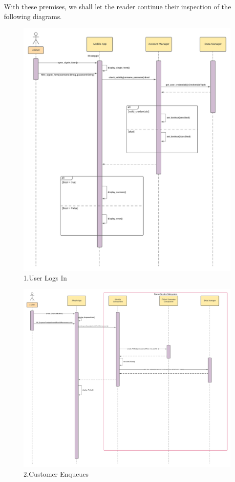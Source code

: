 With these premises, we shall let the reader continue their inspection of the following diagrams.

\begin{figure}[h!]
    \centering
    \includegraphics[width=1\textwidth]{Images/runtimeViewDD/RunTimeViewUserLogIn(1).png}
    \caption{\label{fig:RunTimeViewUserLogsIn}{1.User Logs In}}
\end{figure}

\begin{figure}[h!]
    \centering
    \includegraphics[width=1\textwidth]{Images/runtimeViewDD/RunTimeViewUserEnqueue.png}
    \caption{\label{fig:RunTimeViewUserEnqueue}{2.Customer Enqueues}}
\end{figure}

